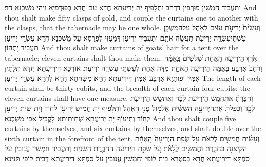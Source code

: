 {וְתַעֲבֵיד חַמְשִׁין פּוּרְפִין דִּדְהַב וּתְלָפֵיף יָת יְרִיעָתָא חֲדָא עִם חֲדָא בְּפוּרְפַיָּא וִיהֵי מַשְׁכְּנָא חַד׃}
{And thou shalt make fifty clasps of gold, and couple the curtains one to another with the clasps, that the tabernacle may be one whole.}{}
{וְעָשִׂ֙יתָ֙ יְרִיעֹ֣ת עִזִּ֔ים לְאֹ֖הֶל עַל\maqqaf הַמִּשְׁכָּ֑ן עַשְׁתֵּי\maqqaf עֶשְׂרֵ֥ה יְרִיעֹ֖ת תַּעֲשֶׂ֥ה אֹתָֽם׃}
{וְתַעֲבֵיד יְרִיעָן דְּמַעְזֵי לְפָרָסָא עַל מַשְׁכְּנָא חֲדָא עֶשְׂרֵי יְרִיעָן תַּעֲבֵיד יָתְהוֹן׃}
{And thou shalt make curtains of goats’ hair for a tent over the tabernacle; eleven curtains shalt thou make them.}{}
{אֹ֣רֶךְ \legarmeh  הַיְרִיעָ֣ה הָֽאַחַ֗ת שְׁלֹשִׁים֙ בָּֽאַמָּ֔ה וְרֹ֙חַב֙ אַרְבַּ֣ע בָּאַמָּ֔ה הַיְרִיעָ֖ה הָאֶחָ֑ת מִדָּ֣ה אַחַ֔ת לְעַשְׁתֵּ֥י עֶשְׂרֵ֖ה יְרִיעֹֽת׃}
{אוּרְכָּא דִּירִיעֲתָא חֲדָא תְּלָתִין אַמִּין וּפוּתְיָא אַרְבַּע אַמִּין דִּירִיעֲתָא חֲדָא מִשְׁחֲתָא חֲדָא לַחֲדָא עֶשְׂרֵי יְרִיעָן׃}
{The length of each curtain shall be thirty cubits, and the breadth of each curtain four cubits; the eleven curtains shall have one measure.}{}
{וְחִבַּרְתָּ֞ אֶת\maqqaf חֲמֵ֤שׁ הַיְרִיעֹת֙ לְבָ֔ד וְאֶת\maqqaf שֵׁ֥שׁ הַיְרִיעֹ֖ת לְבָ֑ד וְכָפַלְתָּ֙ אֶת\maqqaf הַיְרִיעָ֣ה הַשִּׁשִּׁ֔ית אֶל\maqqaf מ֖וּל פְּנֵ֥י הָאֹֽהֶל׃}
{וּתְלָפֵיף יָת חֲמֵישׁ יְרִיעָן לְחוֹד וְיָת שֵׁית יְרִיעָן לְחוֹד וְתֵיעוֹף יָת יְרִיעֲתָא שְׁתִיתֵיתָא לָקֳבֵיל אַפֵּי מַשְׁכְּנָא׃}
{And thou shalt couple five curtains by themselves, and six curtains by themselves, and shalt double over the sixth curtain in the forefront of the tent.}{}
{וְעָשִׂ֜יתָ חֲמִשִּׁ֣ים לֻֽלָאֹ֗ת עַ֣ל שְׂפַ֤ת הַיְרִיעָה֙ הָֽאֶחָ֔ת הַקִּיצֹנָ֖ה בַּחֹבָ֑רֶת וַחֲמִשִּׁ֣ים לֻֽלָאֹ֗ת עַ֚ל שְׂפַ֣ת הַיְרִיעָ֔ה הַחֹבֶ֖רֶת הַשֵּׁנִֽית׃}
{וְתַעֲבֵיד חַמְשִׁין עֲנוּבִּין עַל סִפְתָּא דִּירִיעֲתָא חֲדָא בְּסִטְרָא בֵּית לוֹפֵי וְחַמְשִׁין עֲנוּבִּין עַל סִפְתָּא דִּירִיעֲתָא דְּבֵית לוֹפֵי תִּנְיָנָא׃}
